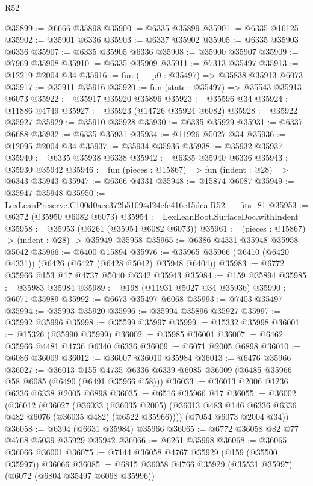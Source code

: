 \begin{lexlean}{R52}
\begin{coremodule}
@35899 := @6666 @35898
@35900 := @6335 @35899
@35901 := @6335 @16125
@35902 := @35901 @6336
@35903 := @6337 @35902
@35905 := @6335 @35903 @6336
@35907 := @6335 @35905 @6336
@35908 := @35900 @35907
@35909 := @7969 @35908
@35910 := @6335 @35909
@35911 := @7313 @35497
@35913 := @12219 @2004 @34
@35916 := fun (__p0 : @35497) => @35838 @35913 @6073
@35917 := @35911 @35916
@35920 := fun (state : @35497) => @35543 @35913 @6073
@35922 := @35917 @35920 @35896
@35923 := @35596 @34
@35924 := @11886 @4749
@35927 := @35923 (@14726 @35924 @6082)
@35928 := @35922 @35927
@35929 := @35910 @35928
@35930 := @6335 @35929
@35931 := @6337 @6688
@35932 := @6335 @35931
@35934 := @11926 @5027 @34
@35936 := @12095 @2004 @34
@35937 := @35934 @35936
@35938 := @35932 @35937
@35940 := @6335 @35938 @6338
@35942 := @6335 @35940 @6336
@35943 := @35930 @35942
@35946 := fun (pieces : @15867) => fun (indent : @28) => @6343 @35943
@35947 := @6366 @4331
@35948 := @15874 @6087
@35949 := @35947 @35948
@35950 := LexLeanPreserve.C100d0aec372b51094d24efe416e15dca.R52.__fits_81
@35953 := @6372 (@35950 @6082 @6073)
@35954 := LexLeanBoot.SurfaceDoc.withIndent
@35958 := @35953 (@6261 (@35954 @6082 @6073))
@35961 := (pieces : @15867) -> (indent : @28) -> @35949 @35958
@35965 := @6386 @4331 @35948 @35958 @5042
@35966 := @6400 @15894
@35976 := @35965 @35966 (@6410 (@6420 @4331)) (@6426 (@6427 (@6428 @5042) @35948 @6404))
@35983 := @6772 @35966 @153 @17 @4737 @5040 @6342 @35943
@35984 := @159 @35894
@35985 := @35983 @35984
@35989 := @198 (@11931 @5027 @34 @35936)
@35990 := @6071 @35989
@35992 := @6673 @35497 @6068
@35993 := @7403 @35497
@35994 := @35993 @35920
@35996 := @35994 @35896 @35927
@35997 := @35992 @35996
@35998 := @35599 @35997
@35999 := @15332 @35998
@36001 := @15326 (@35990 @35999)
@36002 := @35985 @36001
@36007 := @6462 @35966 @4481 @4736 @6340 @6336
@36009 := @6071 @2005 @6898
@36010 := @6086 @36009
@36012 := @36007 @36010 @35984
@36013 := @6476 @35966
@36027 := @36013
    @155
    @4735
    @6336
    @6339
    @6085
    @36009
    (@6485 @35966 @58 @6085 (@6490 (@6491 @35966 @58)))
@36033 := @36013 @2006 @1236 @6336 @6338 @2005 @6898
@36035 := @6516 @35966 @17
@36055 := @36002
    (@36012
      (@36027
        (@36033
          (@36035 @2005)
          (@36013 @483 @146 @6336 @6336 @482 @6076 (@36035 @482) (@6522 @35966))))
      (@7054 @6073 @2004 @34))
@36058 := @6394 (@6631 @35984) @35966
@36065 := @6772 @36058 @82 @77 @4768 @5039 @35929 @35942
@36066 := @6261 @35998
@36068 := @36065 @36066 @36001
@36075 := @7144 @36058 @4767 @35929 (@159 (@35500 @35997)) @36066
@36085 := @6815 @36058 @4766 @35929 (@35531 @35997) (@6072 (@6804 @35497 @6068 @35996))

\end{coremodule}
\end{lexlean}
